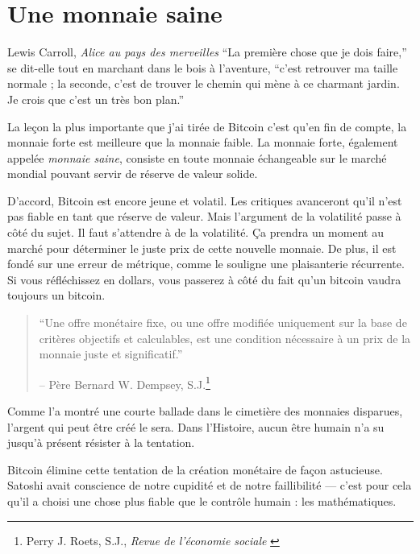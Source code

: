 \chapter{Une monnaie saine}
\label{les:14}

\begin{chapquote}{Lewis Carroll, \textit{Alice au pays des merveilles}}
\enquote{La première chose que je dois faire,} se dit-elle tout en marchant dans
le bois à l’aventure, \enquote{c’est retrouver ma taille normale ; la seconde,
c’est de trouver le chemin qui mène à ce charmant jardin. Je crois que c’est un
très bon plan.}
\end{chapquote}

La leçon la plus importante que j'ai tirée de Bitcoin c'est qu'en fin de compte,
la monnaie forte est meilleure que la monnaie faible. La monnaie forte,
également appelée \textit{monnaie saine}, consiste en toute monnaie échangeable
sur le marché mondial pouvant servir de réserve de valeur solide.

D'accord, Bitcoin est encore jeune et volatil. Les critiques avanceront qu'il
n'est pas fiable en tant que réserve de valeur. Mais l'argument de la volatilité
passe à côté du sujet. Il faut s'attendre à de la volatilité. Ça prendra un
moment au marché pour déterminer le juste prix de cette nouvelle monnaie. De
plus, il est fondé sur une erreur de métrique, comme le souligne une
plaisanterie récurrente. Si vous réfléchissez en dollars, vous passerez à côté
du fait qu'un bitcoin vaudra toujours un bitcoin.

\begin{quotation}\begin{samepage}
\enquote{Une offre monétaire fixe, ou une offre modifiée uniquement sur la base
de critères objectifs et calculables, est une condition nécessaire à un prix de
la monnaie juste et significatif.}
\begin{flushright} -- Père Bernard W. Dempsey, S.J.\footnote{Perry J. Roets,
S.J., \textit{Revue de l'économie sociale} \cite{review-social-economy}}
\end{flushright}\end{samepage}\end{quotation}

\newpage

Comme l'a montré une courte ballade dans le cimetière des monnaies disparues,
l'argent qui peut être créé le sera. Dans l'Histoire, aucun être humain n'a su
jusqu'à présent résister à la tentation.

Bitcoin élimine cette tentation de la création monétaire de façon astucieuse.
Satoshi avait conscience de notre cupidité et de notre faillibilité --- c'est
pour cela qu'il a choisi une chose plus fiable que le contrôle humain : les
mathématiques.

